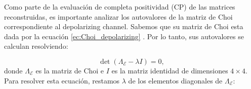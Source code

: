 \documentclass[letterpaper,12pt]{thesisECFM}
\theoremstyle{plain}
\theoremstyle{definition}
\theoremstyle{remark}
\newcommand{\1}{\mathbb{1}}
\begin{document}
\begin{table}[htbp]
\centering 
{}
\caption{Comparación de fidelidad de proceso entre las matrices de Choi reconstruidas del ansatz optimizado. Los resultados de la computadora cuántica fueron tomados en \texttt{ibm-kyoto}, mientras que en el simulador fueron en \texttt{AerSimualtor()} de qiskit. \textbf{Fuente:} elaboración propia.}
\label{tab:comparacion_fidelidades}
\end{table}

Como parte de la evaluación de completa positividad (CP)  de las matrices reconstruidas, es importante analizar los autovalores de la matriz de Choi correspondiente al depolarizing channel. Sabemos que su matriz de Choi esta dada por la ecuación \ref{ec:Choi_depolarizing} . Por lo tanto, sus autovalores se calculan resolviendo:

\begin{equation}
\det(\Lambda_\mathcal{E} - \lambda I) = 0,
\end{equation}
donde $\Lambda_\mathcal{E}$ es la matriz de Choi e $I$ es la matriz identidad de dimensiones $4 \times 4$. Para resolver esta ecuación, restamos $\lambda$ de los elementos diagonales de $\Lambda_\mathcal{E}$:
\end{document}
